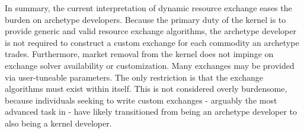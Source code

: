 In summary, the current interpretation of dynamic resource exchange
eases the burden on archetype developers. Because the primary duty of the
kernel is to provide generic and valid resource exchange algorithms,
the archetype developer is not required to construct a custom exchange for
each commodity an archetype trades. Furthermore, market removal from the
kernel does not
impinge on exchange solver availability or customization.  Many exchanges may
be provided via user-tuneable parameters.  The only restriction
is that the exchange algorithms must exist within \cyclus itself.  This is not
considered overly burdensome, because individuals seeking to write custom
exchanges - arguably the most advanced task in \cyclus - have likely
transitioned from being an archetype developer to also being a kernel developer.
